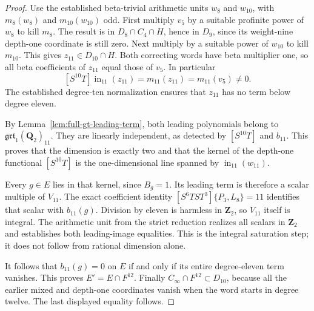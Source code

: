 \begin{proof}
Use the established beta-trivial arithmetic units $w_8$ and
$w_{10}$, with $m_8(w_8)$ and $m_{10}(w_{10})$ odd. First multiply $v_5$ by
a suitable profinite power of $w_8$ to kill $m_8$. The result
is in $D_8\cap C_4\cap H$, hence in $D_9$, since its
weight-nine depth-one coordinate is still zero. Next multiply
by a suitable power of $w_{10}$ to kill $m_{10}$. This gives
$z_{11}\in D_{10}\cap H$. Both correcting words have beta
multiplier one, so all beta coefficients of $z_{11}$ equal
those of $v_5$. In particular
\[
 [S^{10}T]\operatorname{in}_{11}(z_{11})
       =m_{11}(z_{11})=m_{11}(v_5)\ne0.
\]
The established degree-ten normalization ensures that
$z_{11}$ has no term below degree eleven.

By Lemma~\ref{lem:full-gt-leading-term}, both leading polynomials
belong to $\mathfrak{grt}_1(\mathbf Q_2)_{11}$. They are linearly
independent, as detected by $[S^{10}T]$ and $b_{11}$. This proves
that the dimension is exactly two and that the kernel of the
depth-one functional $[S^{10}T]$ is the one-dimensional line
spanned by $\operatorname{in}_{11}(w_{11})$.

Every $g\in E$ lies in that kernel, since $B_g=1$. Its leading
term is therefore a scalar multiple of $V_{11}$. The exact
coefficient identity
$[S^6TST^3]\{P_3,L_8\}=11$ identifies that scalar with
$b_{11}(g)$. Division by eleven is harmless in $\mathbf Z_2$,
so $V_{11}$ itself is integral. The arithmetic unit from the
strict reduction realizes all scalars in $\mathbf Z_2$ and
establishes both leading-image equalities. This is the integral
saturation step; it does not follow from rational dimension
alone.

It follows that $b_{11}(g)=0$ on $E$ if and only if its entire
degree-eleven term vanishes. This proves $E'=E\cap F^{12}$.
Finally $C_\infty\cap F^{12}\subset D_{10}$, because all the
earlier mixed and depth-one coordinates vanish when the word
starts in degree twelve. The last displayed equality follows.
\end{proof}


